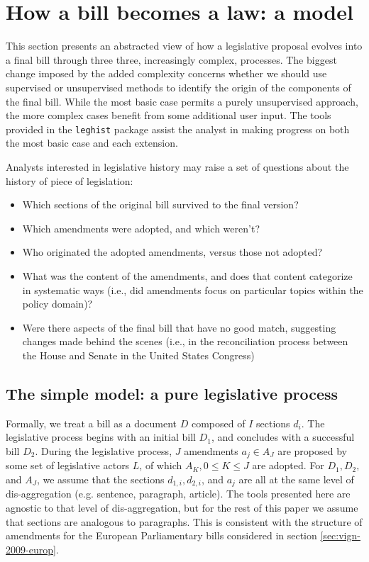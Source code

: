 \documentclass[11pt]{article}
\begin{document}
\section{How a bill becomes a law: a model}
\label{sec:how-bill-becomes}

This section presents an abstracted view of how a legislative proposal
evolves into a final bill through three three,
increasingly complex, processes. The biggest change imposed by the added
complexity concerns whether we should use supervised or unsupervised
methods to identify the origin of the components of the final
bill. While the most basic case permits a purely unsupervised
approach, the more complex cases benefit from some additional user
input. The tools provided in the
\texttt{leghist} package assist the analyst in making progress on both
the most basic case and each extension. 

Analysts interested in legislative history may raise a set of
questions about the history of piece of legislation:
\begin{itemize}
\item Which sections of the original bill survived to the final version?
\item Which amendments were adopted, and which weren't?
\item Who originated the adopted amendments, versus those not adopted?
\item What was the content of the amendments, and does that content
  categorize in systematic ways (i.e., did amendments focus on
  particular topics within the policy domain)?
\item Were there aspects of the final bill that have no good match,
  suggesting changes made behind the scenes (i.e., in the
  reconciliation process between the House and Senate in the United States Congress)
\end{itemize}


\subsection{The simple model: a pure legislative process}
\label{sec:simple-model:-pure}

Formally, we treat a bill as a document $D$ composed of $I$ sections
$d_i$. The legislative process begins with an initial bill $D_1$, and
concludes with a successful bill $D_2$. During the legislative
process, $J$ amendments $a_j \in A_J$ are proposed by some set of
legislative actors $L$, of which $A_K, 0 \leq K \leq J$ are
adopted. For $D_1, D_2,$ and $A_J$, we assume that the sections
$d_{1,i}, d_{2,i}$, and $a_j$ are all at the same level of
dis-aggregation (e.g. sentence, paragraph, article). The tools
presented here are agnostic to that level of dis-aggregation, but for
the rest of this paper we assume that sections are analogous to
paragraphs. This is consistent with the structure of amendments for
the European Parliamentary bills considered in section
\ref{sec:vign-2009-europ}.
\end{document}
